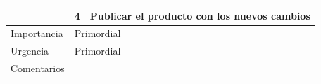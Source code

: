 \begin{table}[th!]
\begin{tabular}{|l|l|l|}
		& 4                                                                           & Publicar el producto con los nuevos cambios                                                                                         \\ \hline
		Importancia                                                                  & \multicolumn{2}{l|}{Primordial}                                                                                                                                                                                   \\ \hline
		Urgencia                                                                     & \multicolumn{2}{l|}{Primordial}                                                                                                                                                                                   \\ \hline
		Comentarios                                                                  & \multicolumn{2}{l|}{}                                                                                                                                                                                             \\ \hline
	\end{tabular}
\end{table}
\newpage
